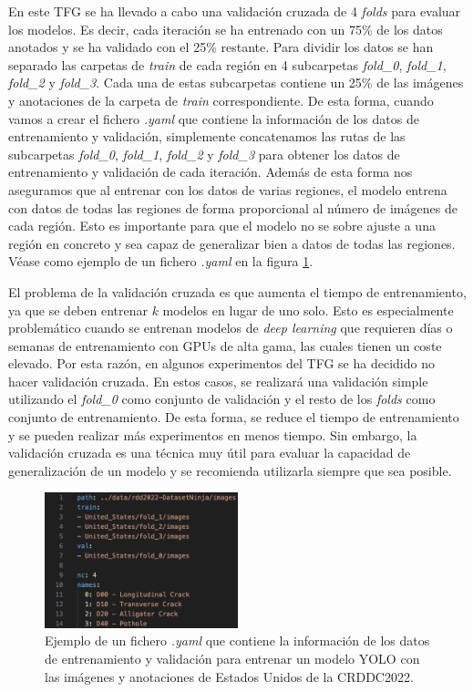 En este TFG se ha llevado a cabo una validación cruzada de 4 \textit{folds} para evaluar los modelos. Es decir, cada iteración se ha entrenado con un 75\% de los datos anotados y se ha validado con el 25\% restante. Para dividir los datos se han separado las carpetas de \textit{train} de cada región en 4 subcarpetas \textit{fold\_0}, \textit{fold\_1}, \textit{fold\_2} y \textit{fold\_3}. Cada una de estas subcarpetas contiene un 25\% de las imágenes y anotaciones de la carpeta de \textit{train} correspondiente. De esta forma, cuando vamos a crear el fichero \textit{.yaml} que contiene la información de los datos de entrenamiento y validación, simplemente concatenamos las rutas de las subcarpetas \textit{fold\_0}, \textit{fold\_1}, \textit{fold\_2} y \textit{fold\_3} para obtener los datos de entrenamiento y validación de cada iteración. Además de esta forma nos aseguramos que al entrenar con los datos de varias regiones, el modelo entrena con datos de todas las regiones de forma proporcional al número de imágenes de cada región. Esto es importante para que el modelo no se sobre ajuste a una región en concreto y sea capaz de generalizar bien a datos de todas las regiones. Véase como ejemplo de un fichero \textit{.yaml} en la figura \ref{fig:yaml_example}.

El problema de la validación cruzada es que aumenta el tiempo de entrenamiento, ya que se deben entrenar $k$ modelos en lugar de uno solo. Esto es especialmente problemático cuando se entrenan modelos de \textit{deep learning} que requieren días o semanas de entrenamiento con GPUs de alta gama, las cuales tienen un coste elevado. Por esta razón, en algunos experimentos del TFG se ha decidido no hacer validación cruzada. En estos casos, se realizará una validación simple utilizando el \textit{fold\_0} como conjunto de validación y el resto de los \textit{folds} como conjunto de entrenamiento. De esta forma, se reduce el tiempo de entrenamiento y se pueden realizar más experimentos en menos tiempo. Sin embargo, la validación cruzada es una técnica muy útil para evaluar la capacidad de generalización de un modelo y se recomienda utilizarla siempre que sea posible.

\begin{figure}[H]
    \centering
    \includegraphics[width=0.5\textwidth]{img/yaml_example.png}
    \caption{Ejemplo de un fichero \textit{.yaml} que contiene la información de los datos de entrenamiento y validación para entrenar un modelo YOLO con las imágenes y anotaciones de Estados Unidos de la CRDDC2022.}
    \label{fig:yaml_example}
\end{figure}

